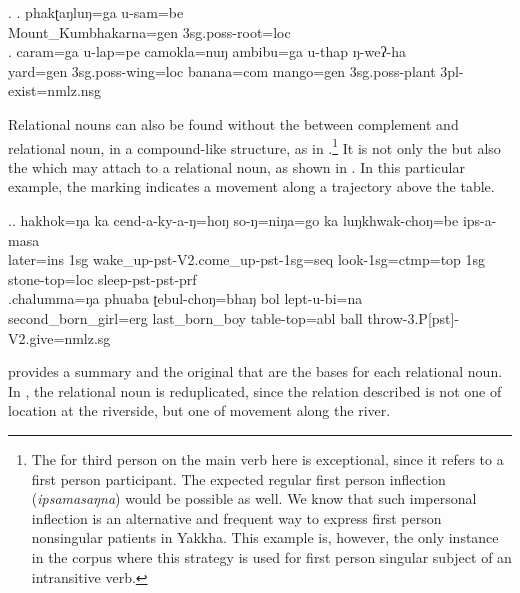 	\ex. \ag. phakʈaŋluŋ=ga        u-sam=be\\
		Mount\_Kumbhakarna{\sc =gen} {\sc 3sg.poss-}root{\sc =loc}	\\
		  
		\bg. caram=ga    u-lap=pe    camokla=nuŋ   ambibu=ga    u-thap     ŋ-weʔ-ha	\\
		yard{\sc =gen} {\sc 3sg.poss-}wing{\sc =loc} banana{\sc =com} mango{\sc =gen} {\sc 3sg.poss-}plant {\sc 3pl-}exist{\sc [npst]=nmlz.nsg}\\
		 
	
	
Relational nouns can also be found without the  between complement and relational noun, in a compound-like structure, as in  \Next[a].\footnote{The  for third person on the main verb here is exceptional, since it refers to a first person participant. The expected regular first person inflection (\emph{ipsamasaŋna}) would be possible as well. We know that such impersonal inflection is an alternative and frequent way to express first person nonsingular patients in Yakkha. This example is, however, the only instance in the corpus where this strategy is used for first person singular subject of an intransitive verb.} 	It is not only the  but also the  which may attach to a relational noun, as shown in \Next[b]. In this particular example, the  marking indicates a movement along a trajectory above the table.
		
 \ex.\ag. hakhok=ŋa  ka  cend-a-ky-a-ŋ=hoŋ so-ŋ=niŋa=go ka  luŋkhwak-choŋ=be  ips-a-masa\\
	later{\sc =ins} {\sc 1sg} wake\_up{\sc -pst-V2.come\_up-pst-1sg=seq} look{\sc -1sg=ctmp=top} {\sc 1sg} stone-top{\sc =loc} sleep{\sc [3sg]-pst-pst-prf}\\
	 
	\bg.chalumma=ŋa phuaba ʈebul-choŋ=bhaŋ bol lept-u-bi=na\\
	second\_born\_girl{\sc =erg} last\_born\_boy table-top{\sc =abl} ball throw{\sc -3.P[pst]-V2.give=nmlz.sg}\\
	
 provides a summary and the original  that are the bases for each relational noun. In \Next, the relational noun is reduplicated, since the relation described is not one of location at the riverside, but one of movement along the river.

